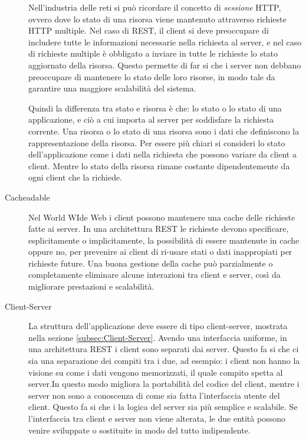 \begin{description}
Nell'industria delle reti si può ricordare il concetto di \emph{sessione} HTTP, ovvero dove lo stato di una risorsa viene mantenuto attraverso richieste HTTP multiple. Nel caso di REST, il client si deve preoccupare di includere tutte le informazioni necessarie nella richiesta al server, e nel caso di richieste multiple è obbligato a inviare in tutte le richieste lo stato aggiornato della risorsa. Questo permette di far si che i server non debbano preoccupare di mantenere lo stato delle loro risorse, in modo tale da garantire una maggiore scalabilità del sistema.

Quindi la differenza tra stato e risorsa è che: lo stato o lo stato di una applicazione, e ciò a cui importa al server per soddisfare la richiesta corrente. Una risorsa o lo stato di una risorsa sono i dati che definiscono la rappresentazione della risorsa.
Per essere più chiari si consideri lo stato dell'applicazione come i dati nella richiesta che possono variare da client a client. Mentre lo stato della risorsa rimane costante dipendentemente da ogni client che la richiede.

\item[Cacheadable]

Nel World WIde Web i client possono mantenere una cache delle richieste fatte ai server. In una architettura REST le richieste devono specificare, esplicitamente o implicitamente, la possibilità di essere mantenute in cache oppure no, per prevenire ai client di ri-usare stati o dati inappropiati per richieste future. Una buona gestione della cache può parzialmente o completamente eliminare alcune interazioni tra client e server, così da migliorare prestazioni e scalabilità.


\item[Client-Server]  

La struttura dell'applicazione deve essere di tipo client-server, mostrata nella sezione \ref{subsec:Client-Server}. Avendo una interfaccia uniforme, in una architettura REST i client sono separati dai server. Questo fa si che ci sia una separazione dei compiti tra i due, ad esempio: i client non hanno la visione su come i dati vengono memorizzati, il quale compito spetta al server.In questo modo migliora la portabilità del codice del client, mentre i server non sono a conoscenza di come sia fatta l'interfaccia utente del client. Questo fa si che i la logica del server sia più semplice e scalabile. Se l'interfaccia tra client e server non viene alterata, le due entità possono venire sviluppate o sostituite in modo del tutto indipendente.  


\end{description}
